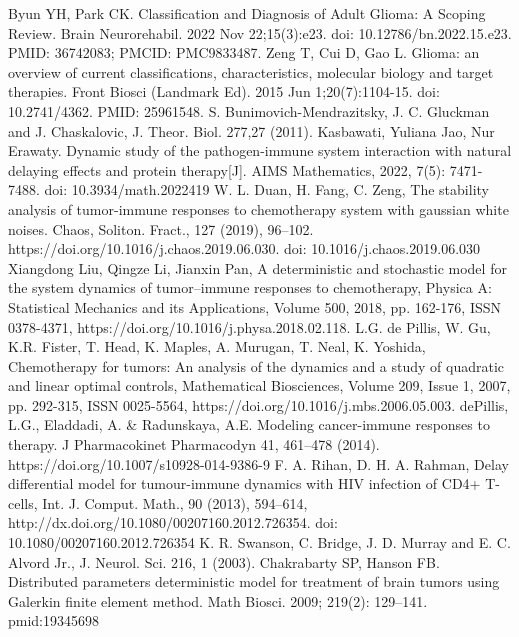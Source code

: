\documentclass[14pt,a4paper]{extarticle}
\begin{document}
	\begin{thebibliography}{6}
		Byun YH, Park CK. Classification and Diagnosis of Adult Glioma: A Scoping Review. Brain Neurorehabil. 2022 Nov 22;15(3):e23. doi: 10.12786/bn.2022.15.e23. PMID: 36742083; PMCID: PMC9833487.
		Zeng T, Cui D, Gao L. Glioma: an overview of current classifications, characteristics, molecular biology and target therapies. Front Biosci (Landmark Ed). 2015 Jun 1;20(7):1104-15. doi: 10.2741/4362. PMID: 25961548.
		S. Bunimovich-Mendrazitsky, J. C. Gluckman and J. Chaskalovic, J. Theor. Biol. 277,27 (2011).
		Kasbawati, Yuliana Jao, Nur Erawaty. Dynamic study of the pathogen-immune system interaction with natural delaying effects and protein therapy[J]. AIMS Mathematics, 2022, 7(5): 7471-7488. doi: 10.3934/math.2022419
		W. L. Duan, H. Fang, C. Zeng, The stability analysis of tumor-immune responses to chemotherapy system with gaussian white noises. Chaos, Soliton. Fract., 127 (2019), 96–102. https://doi.org/10.1016/j.chaos.2019.06.030. doi: 10.1016/j.chaos.2019.06.030 
		Xiangdong Liu, Qingze Li, Jianxin Pan, A deterministic and stochastic model for the system dynamics of tumor–immune responses to chemotherapy, Physica A: Statistical Mechanics and its Applications, Volume 500, 2018, pp. 162-176, ISSN 0378-4371, https://doi.org/10.1016/j.physa.2018.02.118.
		L.G. de Pillis, W. Gu, K.R. Fister, T. Head, K. Maples, A. Murugan, T. Neal, K. Yoshida, Chemotherapy for tumors: An analysis of the dynamics and a study of quadratic and linear optimal controls, Mathematical Biosciences, Volume 209, Issue 1, 2007, pp. 292-315, ISSN 0025-5564, https://doi.org/10.1016/j.mbs.2006.05.003.
		dePillis, L.G., Eladdadi, A. \& Radunskaya, A.E. Modeling cancer-immune responses to therapy. J Pharmacokinet Pharmacodyn 41, 461–478 (2014). https://doi.org/10.1007/s10928-014-9386-9
		F. A. Rihan, D. H. A. Rahman, Delay differential model for tumour-immune dynamics with HIV infection of CD4+ T-cells, Int. J. Comput. Math., 90 (2013), 594–614, http://dx.doi.org/10.1080/00207160.2012.726354. doi: 10.1080/00207160.2012.726354 
		K. R. Swanson, C. Bridge, J. D. Murray and E. C. Alvord Jr., J. Neurol. Sci. 216, 1 (2003).
		Chakrabarty SP, Hanson FB. Distributed parameters deterministic model for treatment of brain tumors using Galerkin finite element method. Math Biosci. 2009; 219(2): 129–141. pmid:19345698

\end{thebibliography}
\end{document}
